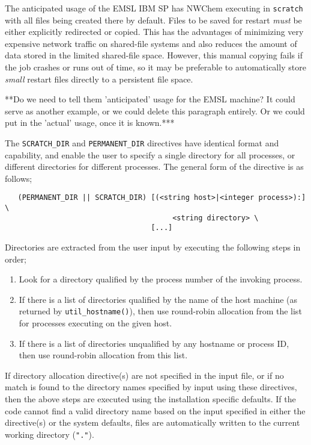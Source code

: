 The anticipated usage of the
EMSL IBM SP has NWChem executing in \verb+scratch+ with all files
being created there by default.  Files to be saved for restart {\em
  must} be either explicitly redirected or copied.  This has the
advantages of minimizing very expensive network traffic on shared-file
systems and also reduces the amount of data stored in the limited
shared-file space.  However, this manual copying fails if the job
crashes or runs out of time, so it may be preferable to automatically
store {\em small} restart files directly to a persistent file space.

\Large
**Do we need to tell them 'anticipated' usage for the EMSL machine?  It
could serve as another example, or we could delete this paragraph
entirely.  Or we could put in the
'actual' usage, once it is known.***
\normalsize

The \verb+SCRATCH_DIR+ and \verb+PERMANENT_DIR+ directives have
identical format and capability, and enable the user to specify a
single directory for all processes, or different directories for
different processes.  The general form of the directive is as follows;

\begin{verbatim}
   (PERMANENT_DIR || SCRATCH_DIR) [(<string host>|<integer process>):] \
                                       <string directory> \ 
                                  [...]
\end{verbatim}

Directories are extracted from the user input by executing the
following steps in order;
\begin{enumerate}
\item Look for a directory qualified by the process number of the
  invoking process.
\item If there is a list of directories qualified by the name of the
  host machine (as returned by \verb+util_hostname()+), then use
  round-robin allocation from the list for processes executing on the
  given host. 
\item If there is a list of directories unqualified by any hostname
  or process ID, then use round-robin allocation from this list.
\end{enumerate}
If directory allocation directive(s) are not specified in the input
file, or if no match is found to the directory names specified by
input using these directives, then the above steps are executed using
the installation specific defaults.  If the code cannot find a valid
directory name based on the input specified in either the directive(s)
or the system defaults, files are automatically written to the current
working directory (\verb+"."+).

